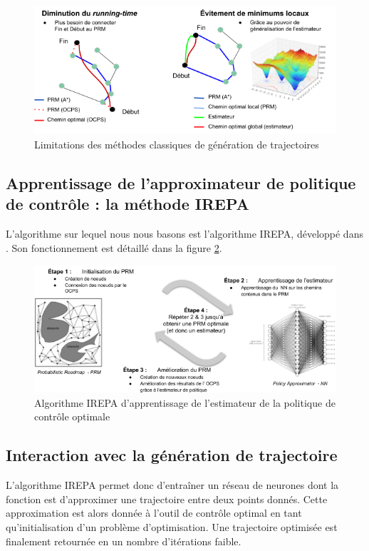 \documentclass[a4paper,12pt]{report}
\begin{document}
\begin{figure}[!htb]
\centering
\includegraphics[width=14cm]{image1_3.png}
\caption{Limitations des méthodes classiques de génération de trajectoires}
\label{fig:limit}
\end{figure}


\subsection{Apprentissage de l'approximateur de politique de contrôle : la méthode IREPA}
\label{sec:IREPA}

L'algorithme sur lequel nous nous basons est l'algorithme IREPA, développé dans \cite{mansard}. Son fonctionnement est détaillé dans la figure \ref{fig:IREPA}.

\begin{figure}[!htb]
\centering
\includegraphics[width=15cm]{image1_4.png}
\caption{Algorithme IREPA d'apprentissage de l'estimateur de la politique de contrôle optimale}
\label{fig:IREPA}
\end{figure}






\subsection{Interaction avec la génération de trajectoire}
L'algorithme IREPA permet donc d'entraîner un réseau de neurones dont la fonction est d'approximer une trajectoire entre deux points donnés. Cette approximation est alors donnée à l'outil de contrôle optimal en tant qu'initialisation d'un problème d'optimisation. Une trajectoire optimisée est finalement retournée en un nombre d'itérations faible.
\end{document}
